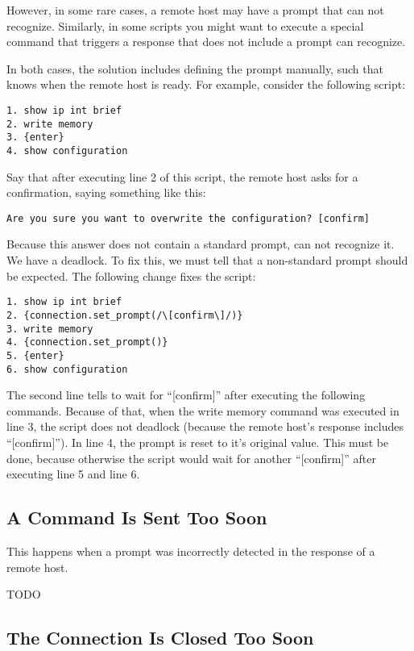 However, in some rare cases, a remote host may have a prompt that \product 
can not recognize. Similarly, in some scripts you might want to execute a 
special command that triggers a response that does not include a prompt 
\product can recognize.

In both cases, the solution includes defining the prompt manually, such 
that \product knows when the remote host is ready. For example, consider 
the following script: 

\begin{lstlisting}
1. show ip int brief
2. write memory
3. {enter}
4. show configuration
\end{lstlisting}

Say that after executing line 2 of this script, the remote host asks for a 
confirmation, saying something like this: 

\begin{lstlisting}
Are you sure you want to overwrite the configuration? [confirm]
\end{lstlisting}

Because this answer does not contain a standard prompt, \product can not 
recognize it. We have a deadlock. To fix this, we must tell \product that 
a non-standard prompt should be expected. The following change fixes the 
script: 

\begin{lstlisting}
1. show ip int brief
2. {connection.set_prompt(/\[confirm\]/)}
3. write memory
4. {connection.set_prompt()}
5. {enter}
6. show configuration
\end{lstlisting}

The second line tells \product to wait for ``[confirm]'' after executing 
the following commands. Because of that, when the write memory command was 
executed in line 3, the script does not deadlock (because the remote host's 
response includes ``[confirm]''). In line 4, the prompt is reset to it's 
original value. This must be done, because otherwise the script would wait 
for another ``[confirm]'' after executing line 5 and line 6. 


\subsection{A Command Is Sent Too Soon}

This happens when a prompt was incorrectly detected in the response of a 
remote host.

TODO 


\subsection{The Connection Is Closed Too Soon}

